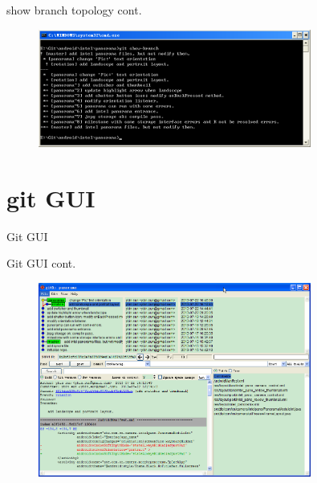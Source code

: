 ﻿\documentclass{beamer}
\begin{document}
\begin{frame}{show branch topology cont.}
\begin{figure}
  \centering
  \includegraphics[width=0.8\textwidth]{showbranch.png}%
\end{figure}
\end{frame}

\section[git GUI]{git GUI}
\begin{frame}{Git GUI}
\end{frame}

\begin{frame}{Git GUI cont.}
\begin{figure}
  \centering
  \includegraphics[width=0.8\textwidth]{gitk.png}%
\end{figure}
\end{frame}
\end{document}
